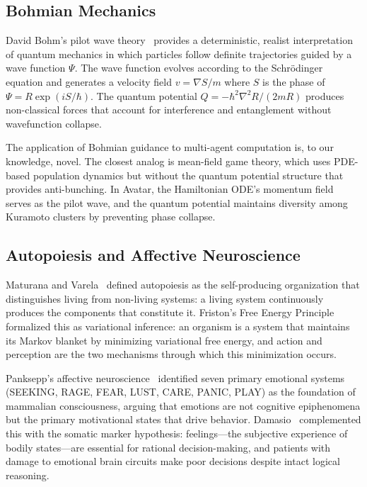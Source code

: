 \documentclass[11pt,a4paper,twocolumn]{article}
\begin{document}
\subsection{Bohmian Mechanics}

David Bohm's pilot wave theory~\cite{bohm1980} provides a deterministic, realist interpretation of quantum mechanics in which particles follow definite trajectories guided by a wave function $\Psi$.
The wave function evolves according to the Schr\"odinger equation and generates a velocity field $v = \nabla S / m$ where $S$ is the phase of $\Psi = R \exp(iS/\hbar)$.
The quantum potential $Q = -\hbar^2 \nabla^2 R / (2mR)$ produces non-classical forces that account for interference and entanglement without wavefunction collapse.

The application of Bohmian guidance to multi-agent computation is, to our knowledge, novel.
The closest analog is mean-field game theory, which uses PDE-based population dynamics but without the quantum potential structure that provides anti-bunching.
In Avatar, the Hamiltonian ODE's momentum field serves as the pilot wave, and the quantum potential maintains diversity among Kuramoto clusters by preventing phase collapse.

\subsection{Autopoiesis and Affective Neuroscience}

Maturana and Varela~\cite{maturana1980} defined autopoiesis as the self-producing organization that distinguishes living from non-living systems: a living system continuously produces the components that constitute it.
Friston's Free Energy Principle~\cite{friston2010} formalized this as variational inference: an organism is a system that maintains its Markov blanket by minimizing variational free energy, and action and perception are the two mechanisms through which this minimization occurs.

Panksepp's affective neuroscience~\cite{panksepp1998} identified seven primary emotional systems (SEEKING, RAGE, FEAR, LUST, CARE, PANIC, PLAY) as the foundation of mammalian consciousness, arguing that emotions are not cognitive epiphenomena but the primary motivational states that drive behavior.
Damasio~\cite{damasio1999} complemented this with the somatic marker hypothesis: feelings---the subjective experience of bodily states---are essential for rational decision-making, and patients with damage to emotional brain circuits make poor decisions despite intact logical reasoning.
\end{document}
